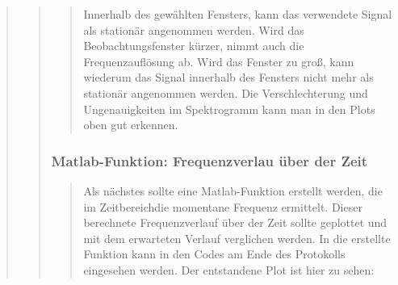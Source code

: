 \begin{quote}
\begin{quote}
\begin{quote}
                \vspace{1.5em}
        
        Innerhalb des gewählten Fensters, kann das verwendete Signal als
        stationär angenommen werden. Wird das Beobachtungsfenster kürzer, nimmt
        auch die Frequenzauflösung ab. Wird das Fenster zu groß, kann wiederum
        das Signal innerhalb des Fensters nicht mehr als stationär angenommen
        werden. Die Verschlechterung und Ungenauigkeiten im Spektrogramm kann
        man in den Plots oben gut erkennen.
        
        \end{quote}%
	    
	    \subsubsection{Matlab-Funktion: Frequenzverlau über der Zeit}
	    \begin{quote}
	    
	    Als nächstes sollte eine Matlab-Funktion erstellt werden, die im
	    Zeitbereichdie momentane Frequenz ermittelt. Dieser berechnete
	    Frequenzverlauf über der Zeit sollte geplottet und mit dem erwarteten
	    Verlauf verglichen werden. In die erstellte Funktion kann in den Codes am
	    Ende des Protokolls eingesehen werden. Der entstandene Plot ist hier zu
	    sehen:
	    

\end{quote}
\end{quote}
\end{quote}
